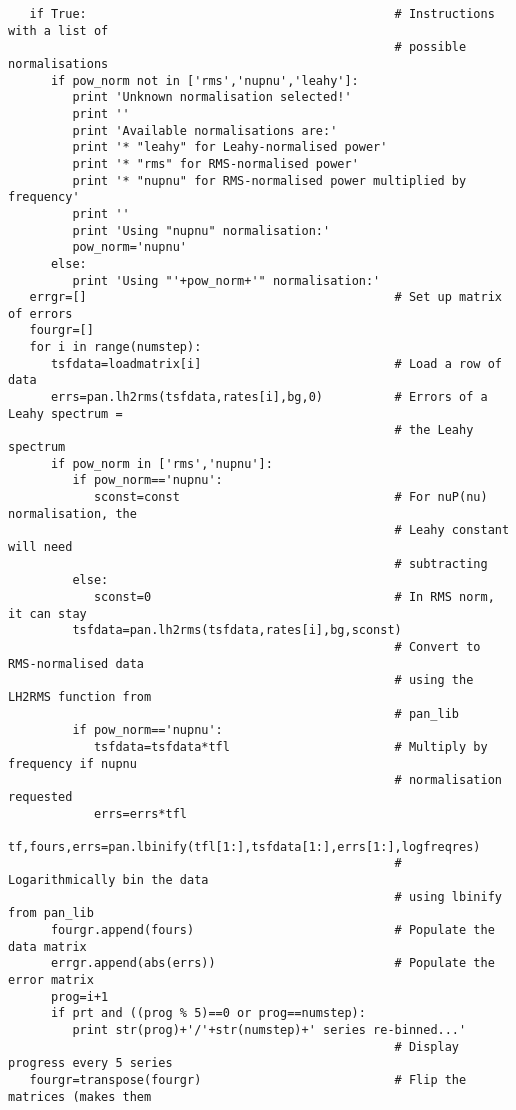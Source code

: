 \begin{verbatim}
   if True:                                           # Instructions with a list of
                                                      # possible normalisations
      if pow_norm not in ['rms','nupnu','leahy']:
         print 'Unknown normalisation selected!'
         print ''
         print 'Available normalisations are:'
         print '* "leahy" for Leahy-normalised power'
         print '* "rms" for RMS-normalised power'
         print '* "nupnu" for RMS-normalised power multiplied by frequency'
         print ''
         print 'Using "nupnu" normalisation:'
         pow_norm='nupnu'
      else:
         print 'Using "'+pow_norm+'" normalisation:'
   errgr=[]                                           # Set up matrix of errors
   fourgr=[]
   for i in range(numstep):
      tsfdata=loadmatrix[i]                           # Load a row of data
      errs=pan.lh2rms(tsfdata,rates[i],bg,0)          # Errors of a Leahy spectrum =
                                                      # the Leahy spectrum
      if pow_norm in ['rms','nupnu']:
         if pow_norm=='nupnu':
            sconst=const                              # For nuP(nu) normalisation, the
                                                      # Leahy constant will need
                                                      # subtracting
         else:
            sconst=0                                  # In RMS norm, it can stay
         tsfdata=pan.lh2rms(tsfdata,rates[i],bg,sconst)
                                                      # Convert to RMS-normalised data
                                                      # using the LH2RMS function from
                                                      # pan_lib
         if pow_norm=='nupnu':
            tsfdata=tsfdata*tfl                       # Multiply by frequency if nupnu
                                                      # normalisation requested
            errs=errs*tfl
      tf,fours,errs=pan.lbinify(tfl[1:],tsfdata[1:],errs[1:],logfreqres)
                                                      # Logarithmically bin the data
                                                      # using lbinify from pan_lib
      fourgr.append(fours)                            # Populate the data matrix
      errgr.append(abs(errs))                         # Populate the error matrix
      prog=i+1
      if prt and ((prog % 5)==0 or prog==numstep):
         print str(prog)+'/'+str(numstep)+' series re-binned...'
                                                      # Display progress every 5 series
   fourgr=transpose(fourgr)                           # Flip the matrices (makes them

\end{verbatim}
